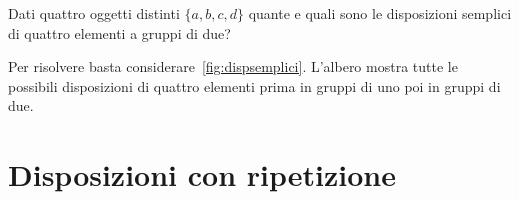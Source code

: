 \begin{exmp}
	Dati quattro oggetti distinti $\lbrace a,b,c,d \rbrace$ quante e quali sono le disposizioni semplici di quattro elementi a gruppi di due? 
\end{exmp}
Per risolvere basta considerare~\vref{fig:dispsemplici}. L'albero mostra tutte le possibili disposizioni di quattro elementi prima in gruppi di uno poi in gruppi di due.
\section{Disposizioni con ripetizione} 

